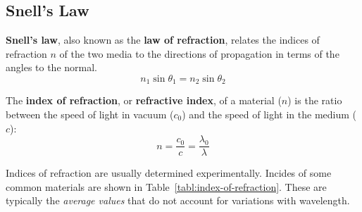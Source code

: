 \subsection{Snell's Law}
\textbf{Snell's law}, also known as the \textbf{law of refraction}, relates the
indices of refraction $n$ of the two media to the directions of propagation
in terms of the angles to the normal. 
\begin{equation}
  \boxed{
    n_1\sin\theta_1=n_2\sin\theta_2
  }
  \label{eq:law-of-refraction}
\end{equation}
%
%
%
%
%  
%    
%  
%
%
%
%
%

The \textbf{index of refraction}, or \textbf{refractive index}, of a material
($n$) is the ratio between the speed of light in vacuum ($c_0$) and the speed
of light in the medium ($c$):
\begin{equation}
  \boxed{n=\frac{c_0}c=\frac{\lambda_0}\lambda}
\end{equation}
%
%    


Indices of refraction are usually determined experimentally. Incides of some
common materials are shown in Table~\ref{tabl:index-of-refraction}. These are
typically the \emph{average values} that do not account for variations with
wavelength.

